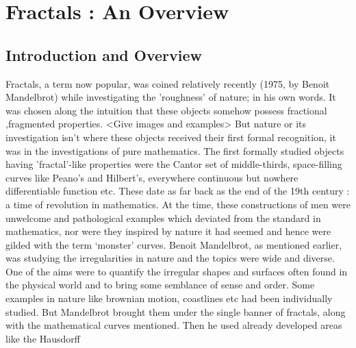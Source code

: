 
\chapter{Fractals : An Overview} %

\label{Chapter3} %


\section{Introduction and Overview}
Fractals, a term now popular, was coined relatively recently (1975, by Benoit
Mandelbrot) while investigating the 'roughness' of nature; in his own words.
It was chosen along the intuition that these objects somehow possess fractional
,fragmented properties.
<Give images and examples> 
\newline
But nature or its investigation isn't where these objects received their first
formal recognition, it was in the investigations of pure mathematics. The first
formally studied objects having 'fractal'-like properties were the Cantor set of
middle-thirds, space-filling curves like Peano's and Hilbert's,
everywhere continuous but nowhere differentiable function etc. These date as far
back as the end of the 19th century : a time of revolution in mathematics. 
At the time, these constructions of men
were unwelcome and pathological examples which deviated from the standard in
mathematics, nor were they inspired by nature it had
seemed and hence were gilded with
the term `monster' curves.
\newline
Benoit Mandelbrot, as mentioned earlier, was studying the irregularities in
nature and the topics were wide and diverse. One of the aims were to quantify
the irregular shapes and surfaces often found in the physical world
and to bring some semblance of sense and order. Some examples in nature like
brownian motion, coastlines etc had been individually studied. But Mandelbrot
brought them under the single banner of fractals, along with the mathematical
curves mentioned. Then he used already developed areas like the Hausdorff
